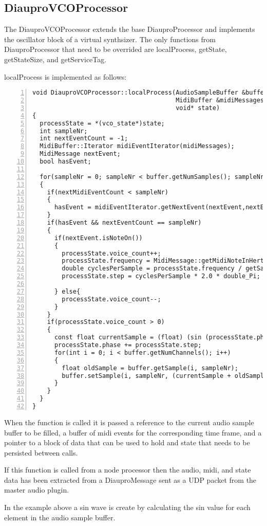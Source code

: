 \subsection{DiauproVCOProcessor}

The DiauproVCOProcessor extends the base DiauproProcessor and implements the oscillator block of a virtual synthsizer. The only functions from DiauproProcessor that need to be overrided are localProcess, getState, getStateSize, and getServiceTag.

localProcess is implemented as follows:
\begin{lstlisting}[numbers=left]
void DiauproVCOProcessor::localProcess(AudioSampleBuffer &buffer,
                                       MidiBuffer &midiMessages,
                                       void* state)
{
  processState = *(vco_state*)state;
  int sampleNr;
  int nextEventCount = -1;
  MidiBuffer::Iterator midiEventIterator(midiMessages);
  MidiMessage nextEvent;
  bool hasEvent;

  for(sampleNr = 0; sampleNr < buffer.getNumSamples(); sampleNr++)
  {
    if(nextMidiEventCount < sampleNr)
    {
      hasEvent = midiEventIterator.getNextEvent(nextEvent,nextEventCount )
    }
    if(hasEvent && nextEventCount == sampleNr)
    {
      if(nextEvent.isNoteOn())
      {
        processState.voice_count++;
        processState.frequency = MidiMessage::getMidiNoteInHertz(nextEvent.getNoteNumber());
        double cyclesPerSample = processState.frequency / getSampleRate();
        processState.step = cyclesPerSample * 2.0 * double_Pi;

      } else{
        processState.voice_count--;
      }
    }
    if(processState.voice_count > 0)
    {
      const float currentSample = (float) (sin (processState.phase) * processState.level);
      processState.phase += processState.step;
      for(int i = 0; i < buffer.getNumChannels(); i++)
      {
        float oldSample = buffer.getSample(i, sampleNr);
        buffer.setSample(i, sampleNr, (currentSample + oldSample)*0.5);
      }
    }
  }
}
\end{lstlisting}

\noindent
When the function is called it is passed a reference to the current audio sample buffer to be filled, a buffer of midi events for the corresponding time frame, and a pointer to a block of data that can be used to hold and state that needs to be persisted between calls.

If this function is called from a node processor then the audio, midi, and state data has been extracted from a DiauproMessage sent as a UDP packet from the master audio plugin.

In the example above a sin wave is create by calculating the sin value for each element in the audio sample buffer.